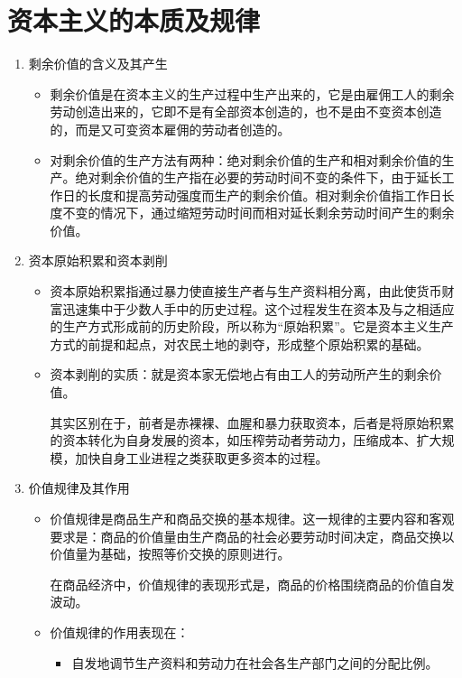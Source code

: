 \documentclass[device=pad,lang=cn,UTF8]{elegantbook}
\begin{document}
    \chapter{资本主义的本质及规律}
    \begin{enumerate}
        \item 剩余价值的含义及其产生
        \begin{itemize}
            \item 剩余价值是在资本主义的生产过程中生产出来的，它是由雇佣工人的剩余劳动创造出来的，它即不是有全部资本创造的，也不是由不变资本创造的，而是又可变资本雇佣的劳动者创造的。
            \item 对剩余价值的生产方法有两种：绝对剩余价值的生产和相对剩余价值的生产。绝对剩余价值的生产指在必要的劳动时间不变的条件下，由于延长工作日的长度和提高劳动强度而生产的剩余价值。相对剩余价值指工作日长度不变的情况下，通过缩短劳动时间而相对延长剩余劳动时间产生的剩余价值。
        \end{itemize}
        \item 资本原始积累和资本剥削
        \begin{itemize}
            \item 资本原始积累指通过暴力使直接生产者与生产资料相分离，由此使货币财富迅速集中于少数人手中的历史过程。这个过程发生在资本及与之相适应的生产方式形成前的历史阶段，所以称为“原始积累”。它是资本主义生产方式的前提和起点，对农民土地的剥夺，形成整个原始积累的基础。
            \item 资本剥削的实质：就是资本家无偿地占有由工人的劳动所产生的剩余价值。\par
            其实区别在于，前者是赤裸裸、血腥和暴力获取资本，后者是将原始积累的资本转化为自身发展的资本，如压榨劳动者劳动力，压缩成本、扩大规模，加快自身工业进程之类获取更多资本的过程。            
        \end{itemize}
        \item 价值规律及其作用
        \begin{itemize}
            \item 价值规律是商品生产和商品交换的基本规律。这一规律的主要内容和客观要求是：商品的价值量由生产商品的社会必要劳动时间决定，商品交换以价值量为基础，按照等价交换的原则进行。\par
            在商品经济中，价值规律的表现形式是，商品的价格围绕商品的价值自发波动。
            \item 价值规律的作用表现在：
            \begin{itemize}
                \item 自发地调节生产资料和劳动力在社会各生产部门之间的分配比例。

\end{itemize}
\end{itemize}
\end{enumerate}
\end{document}
